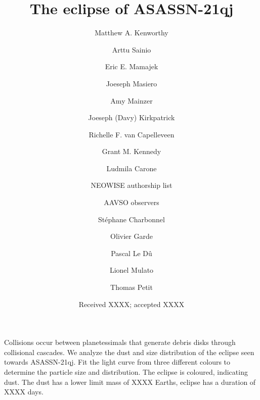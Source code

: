 \documentclass{aa}
\newcommand{\asas}{ASASSN-21qj}
\begin{document}
 

   \title{The eclipse of ASASSN-21qj}

   \author{Matthew A. Kenworthy
          \and
          Arttu Sainio
          \and
          Eric E. Mamajek
          \and
          Joeseph Masiero
          \and
          Amy Mainzer
          \and
          Joeseph (Davy) Kirkpatrick
          \and 
          Richelle F. van Capelleveen
          \and
          Grant M. Kennedy
          \and
          Ludmila Carone
          \and
          NEOWISE authorship list
          \and
          AAVSO observers
          \and
          St\'{e}phane Charbonnel
          \and
        Olivier Garde
        \and
        Pascal Le D\^{u}
        \and
        Lionel Mulato
        \and
        Thomas Petit
          }

   \date{Received XXXX; accepted XXXX}

 
  \abstract
   {Collisions occur between planetessimals that generate debris disks through collisional cascades.}
   {We analyze the dust and size distribution of the eclipse seen towards \asas.}
   {Fit the light curve from three different colours to determine the particle size and distribution.}
   {The eclipse is coloured, indicating dust.
   The dust has a lower limit mass of XXXX Earths, eclipse has a duration of XXXX days.}
   {}
\end{document}
